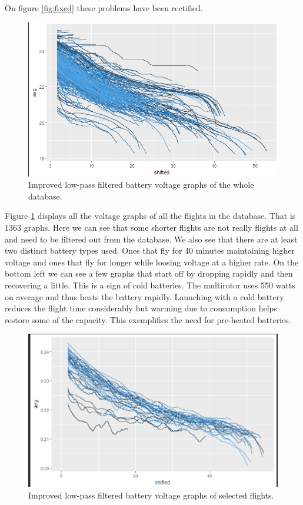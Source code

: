 \documentclass[12pt,oneside]{reedthesis}
\theoremstyle{definition}
\theoremstyle{definition}
\theoremstyle{definition}
\theoremstyle{remark}
\begin{document}
On figure \ref{fig:fixed} these problems have been rectified.
\begin{figure}
\centering
\includegraphics{./figure/allbat.PNG}
\caption{\label{fig:allbat}Improved low-pass filtered battery voltage graphs
of the whole database.}
\end{figure}
Figure \ref{fig:allbat} displays all the voltage graphs of all the
flights in the database. That is 1363 graphs. Here we can see that some
shorter flights are not really flights at all and need to be filtered
out from the database. We also see that there are at least two distinct
battery types used. Ones that fly for 40 minutes maintaining higher
voltage and ones that fly for longer while loosing voltage at a higher
rate. On the bottom left we can see a few graphs that start off by
dropping rapidly and then recovering a little. This is a sign of cold
batteries. The multirotor uses 550 watts on average and thus heats the
battery rapidly. Launching with a cold battery reduces the flight time
considerably but warming due to consumption helps restore some of the
capacity. This exemplifies the need for pre-heated batteries.
\begin{figure}
\centering
\includegraphics{./figure/rmkRohelineAku.PNG}
\caption{\label{fig:roheline}Improved low-pass filtered battery voltage
graphs of selected flights.}
\end{figure}
\end{document}
